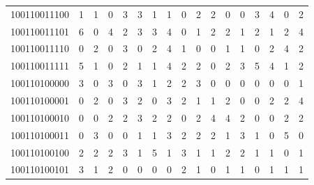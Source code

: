 \documentclass[10pt,a4paper]{article}
\begin{document}
\begin{longtable}{ |c|c|c|c|c|c|c|c|c|c|c|c|c|c|c|c|c| }
    100110011100              & 1                            & 1                                & 0                            & 3                              & 3   & 1   & 1   & 0   & 2   & 2   & 0   & 0   & 3   & 4   & 0   & 2   \\
    100110011101              & 6                            & 0                                & 4                            & 2                              & 3   & 3   & 4   & 0   & 1   & 2   & 2   & 1   & 2   & 1   & 2   & 4   \\
    100110011110              & 0                            & 2                                & 0                            & 3                              & 0   & 2   & 4   & 1   & 0   & 0   & 1   & 1   & 0   & 2   & 4   & 2   \\
    100110011111              & 5                            & 1                                & 0                            & 2                              & 1   & 1   & 4   & 2   & 2   & 0   & 2   & 3   & 5   & 4   & 1   & 2   \\
    100110100000              & 3                            & 0                                & 3                            & 0                              & 3   & 1   & 2   & 2   & 3   & 0   & 0   & 0   & 0   & 0   & 0   & 1   \\
    100110100001              & 0                            & 2                                & 0                            & 3                              & 2   & 0   & 3   & 2   & 1   & 1   & 2   & 0   & 0   & 2   & 2   & 4   \\
    100110100010              & 0                            & 0                                & 2                            & 2                              & 3   & 2   & 2   & 0   & 2   & 4   & 4   & 2   & 0   & 0   & 2   & 2   \\
    100110100011              & 0                            & 3                                & 0                            & 0                              & 1   & 1   & 3   & 2   & 2   & 2   & 1   & 3   & 1   & 0   & 5   & 0   \\
    100110100100              & 2                            & 2                                & 2                            & 3                              & 1   & 5   & 1   & 3   & 1   & 1   & 2   & 2   & 1   & 1   & 0   & 1   \\
    100110100101              & 3                            & 1                                & 2                            & 0                              & 0   & 0   & 0   & 2   & 1   & 0   & 1   & 1   & 0   & 1   & 1   & 1   \\

\end{longtable}
\end{document}
